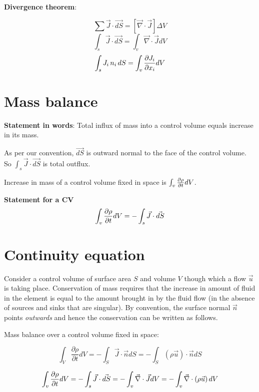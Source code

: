 {\bf Divergence theorem}:

$$ \sum{\vec{J} \cdot \vec{dS}} = \left[ \vec{\nabla} \cdot \vec{J} \right] \Delta V $$
$$ \int_{s}{\vec{J} \cdot \vec{dS}} = \int_{v}{\vec{\nabla} \cdot \vec{J} dV} $$ 
$$ \int_{s}{J_i \, n_i \, dS} = \int_{v}{ {\partial J_i \over \partial x_i} dV} $$ 


\section{Mass balance}

{\bf Statement in words}:
Total influx of mass into a control volume equals increase in its mass.

As per our convention, $\vec{dS}$ is outward normal to the face of the control volume. So $\int_{s}{\vec{J} \cdot \vec{dS}}$ is total outflux.

Increase in mass of a control volume fixed in space is $\int_{v}{{\partial \rho \over \partial t} dV}$.

{\bf Statement for a CV }
$$\int_{v}{{\partial \rho \over \partial t} dV} = - \int_{s}{\vec{J} \cdot \vec{dS}}$$



\section{Continuity equation}

Consider a control volume of surface area $S$ and volume $V$ though which a flow $\vec{u}$ is taking place. Conservation of mass requires that the increase in amount of fluid in the element is equal to the amount brought in by the fluid flow (in the absence of sources and sinks that are singular). By convention, the surface normal $\vec{n}$ points {\em outwards} and hence the conservation can be written as follows.

Mass balance over a control volume fixed in space:

\begin{equation}
	\int_{V}{\frac{\partial \rho}{\partial t} dV} = -\int_{S}{\vec{J} \cdot\vec{n}dS} = -\int_{S}{\left( \rho\vec{u} \right) \cdot\vec{n}dS}
\end{equation} 

$$ \int_{v}{{\partial \rho \over \partial t} dV} = - \int_{s}{\vec{J} \cdot \vec{dS}} = - \int_{v}{\vec{\nabla} \cdot \vec{J} dV} = - \int_{v}{\vec{\nabla} \cdot \left(\rho \vec{u} \right) dV} $$

